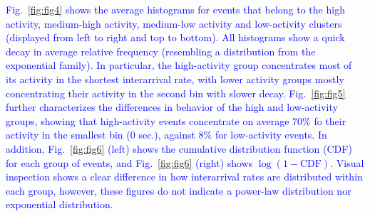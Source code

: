 \documentclass[10pt,letterpaper]{article}
\begin{document}




\textcolor{blue}{Fig.~\ref{fig:fig4} shows the average histograms for events that
belong to the high activity, medium-high activity, medium-low activity
and low-activity clusters (displayed from left to right and top to
bottom). All histograms show a quick decay in average relative
frequency (resembling a distribution from the exponential family). In
particular, the high-activity group concentrates most of its activity
in the shortest interarrival rate, with lower activity groups mostly
concentrating their activity in the second bin with slower
decay. Fig.~\ref{fig:fig5} further characterizes the differences in
behavior of the high and low-activity groups, showing that
high-activity events concentrate on average $70\%$ fo their activity
in the smallest bin ($0$ sec.), against $8\%$ for low-activity
events. In addition, Fig.~\ref{fig:fig6} (left) shows the cumulative
distribution function (CDF) for each group of events, and
Fig.~\ref{fig:fig6} (right) shows $\log{(1 - \mathrm{CDF})}$. Visual
inspection shows a clear difference in how interarrival rates are
distributed within each group, however, these figures do not indicate a
power-law distribution nor exponential distribution.}
\end{document}
